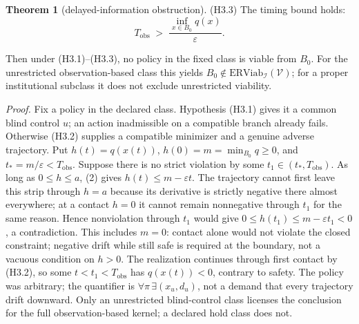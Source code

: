 \documentclass[11pt]{article}
\theoremstyle{definition}
\newtheorem{theorem}{Theorem}
\begin{document}
\begin{theorem}[delayed-information obstruction]
(H3.3) The timing bound holds:
\[T_{\mathrm{obs}} \;>\; \frac{\inf_{x \in B_0} q(x)}{\varepsilon}. \tag{3}\]

Then under (H3.1)--(H3.3), no policy in the fixed class is viable
from \(B_0\). For the unrestricted observation-based class this yields
\(B_0\notin\mathrm{ERViab}_{\mathcal I}(\mathcal V)\); for a proper
institutional subclass it does not exclude unrestricted viability.

\end{theorem}

\emph{Proof.} Fix a policy in the declared class. Hypothesis (H3.1)
gives it a common blind control \(u\); an action inadmissible on a
compatible branch already fails. Otherwise (H3.2) supplies a compatible
minimizer and a genuine adverse trajectory. Put
\(h(t)=q(x(t))\), \(h(0)=m=\min_{B_0}q\ge0\), and
\(t_*=m/\varepsilon<T_{\mathrm{obs}}\). Suppose there is no strict
violation by some \(t_1\in(t_*,T_{\mathrm{obs}})\). As long as
\(0\le h\le a\), (2) gives \(h(t)\le m-\varepsilon t\).
The trajectory cannot first leave this strip through \(h=a\) because
its derivative is strictly negative there almost everywhere; at a
contact \(h=0\) it cannot remain nonnegative through \(t_1\)
for the same reason. Hence nonviolation through \(t_1\) would give
\(0\le h(t_1)\le m-\varepsilon t_1<0\), a contradiction.
This includes \(m=0\): contact alone would not violate the closed constraint; negative drift while still safe is required at the boundary,
not a vacuous condition on \(h>0\). The realization continues through
first contact by (H3.2), so some \(t<t_1<T_{\mathrm{obs}}\) has
\(q(x(t))<0\), contrary to safety. The policy was arbitrary; the
quantifier is \(\forall\pi\,\exists(x_u,d_u)\), not a demand that
every trajectory drift downward.
Only an unrestricted blind-control class licenses the conclusion for the
full observation-based kernel; a declared hold class does not.
\end{document}
